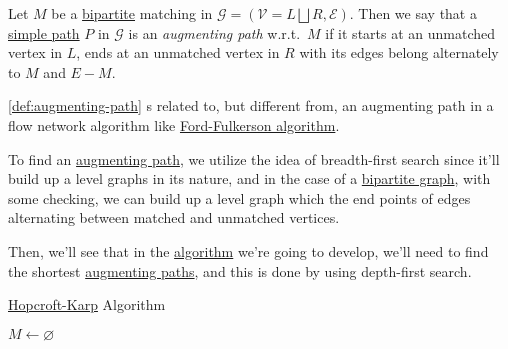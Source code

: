 \begin{definition}\label{def:augmenting-path}
	Let \(M\) be a \href{https://en.wikipedia.org/wiki/Bipartite_graph}{bipartite} matching in \(\mathcal{G} = (\mathcal{V} = L \bigsqcup  R, \mathcal{E})\). Then we say that a \hyperref[def:simple-path]{simple path} \(P\) in \(\mathcal{G} \) is an \emph{augmenting path} w.r.t.\ \(M\) if it starts at an unmatched vertex in \(L\), ends at an unmatched vertex in \(R\) with its edges belong alternately to \(M\) and \(E - M\).
\end{definition}

\begin{note}
	\autoref{def:augmenting-path} s related to, but different from, an augmenting path in a flow network algorithm like \href{https://en.wikipedia.org/wiki/Ford%E2%80%93Fulkerson_algorithm}{Ford-Fulkerson algorithm}.
\end{note}

\begin{intuition}
	To find an \hyperref[def:augmenting-path]{augmenting path}, we utilize the idea of breadth-first search since it'll build up a level graphs in its nature, and in the case of a \href{https://en.wikipedia.org/wiki/Bipartite_graph}{bipartite graph}, with some checking, we can build up a level graph which the end points of edges alternating between matched and unmatched vertices.
\end{intuition}

Then, we'll see that in the \hyperref[algo:Hopcroft-Karp-algorithm]{algorithm} we're going to develop, we'll need to find the shortest \hyperref[def:augmenting-path]{augmenting paths}, and this is done by using depth-first search.

\begin{algorithm}[H]\label{algo:Hopcroft-Karp-algorithm}
	\DontPrintSemicolon
	\caption{\href{https://en.wikipedia.org/wiki/Hopcroft-Karp_algorithm}{Hopcroft-Karp} Algorithm}
	\BlankLine

	\(M\gets \varnothing \)
\end{algorithm}

